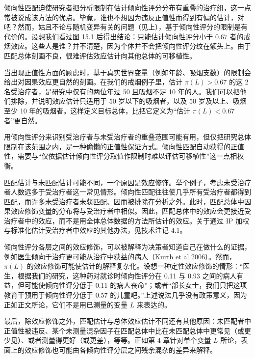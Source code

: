 倾向性匹配迫使研究者把分析限制在估计倾向性评分分布有重叠的治疗组，这一点常被说成该方法的优点。毕竟，谁也不想因为违反正值性而得到有偏的估计，对吧？然而，姑且不论与随机变异有关的问题（见上），基于倾向性评分的限制是有代价的。设想我们看过图 15.1 后得出结论：只能估计倾向性评分小于 0.67 者的戒烟效应。这些人是谁？并不清楚，因为个体并不会把倾向性评分纹在额头上。由于匹配总体刻画不良，很难评估效应估计向其他总体的可移植性。

当出现正值性方面的顾虑时，基于真实世界变量（例如年龄、吸烟支数）的限制会给出对因果效应更自然的刻画。在我们的戒烟例子里，估计 $\pi(L)>0.67$ 的这 2 名受治疗者，是研究中仅有的两位年过 50 且吸烟不足 10 年的人。我们可以把他们排除，并说明效应估计只适用于 50 岁以下的吸烟者，以及 50 岁及以上、吸烟至少 10 年的吸烟者。这样定义目标总体，比把它定义为“估计 $\pi(L)<0.67$ 者”更自然。

用倾向性评分来识别受治疗者与未受治疗者的重叠范围可能有用，但仅把研究总体限制在该范围之内，是一种偷懒的正值性保证方式。倾向性匹配自动获得的正值性，需要与“仅依据估计倾向性评分取值作限制时难以评估可移植性”这一点相权衡。

\begin{finepoint}[效应修饰与倾向性评分]
匹配估计与未匹配估计可能不同，一个原因是效应修饰。举个例子，考虑未受治疗者人数远多于受治疗者这一常见情形。倾向性匹配往往使几乎所有受治疗者都得到匹配，而许多未受治疗者未获匹配、因而被排除在分析之外。此时，匹配总体中因果效应修饰变量的分布将与受治疗者中相似。因此，匹配总体中的效应会更接近受治疗者中的效应，而不是用全体总体数据的方法所估计的效应。关于通过 IP 加权与标准化估计受治疗者中效应的其他办法，见技术注记 4.1。

倾向性评分各层之间的效应修饰，可以被解释为决策者知道自己在做什么的证据，例如医生倾向于治疗更可能从治疗中获益的病人（Kurth et al 2006）。然而，$\pi(L)$ 的效应修饰可能使估计的解释复杂化。设想一种定性效应修饰的情形：“医生，根据我们的研究，这种药对就诊时倾向性评分在 0.11 与 0.93 之间的病人有益，但可能使倾向性评分低于 0.11 的病人丧命”；或者“部长女士，我们只把这项教育干预用于倾向性评分低于 0.57 的儿童吧。”上述说法几乎没有政策意义，因为正如正文所论，它们不是用已测量的变量 $L$ 来表达的。

最后，除效应修饰之外，匹配估计与总体效应估计不同还有其他原因：未匹配者中正值性被违反、某个未测量混杂因子在匹配总体中比在未匹配总体中更常见（或更少见）、或者测量得更好（或更差），等等。正如第 4 章针对单个变量 $L$ 所论，表面上的效应修饰也可能由各倾向性评分层之间残余混杂的差异来解释。
\end{finepoint}


